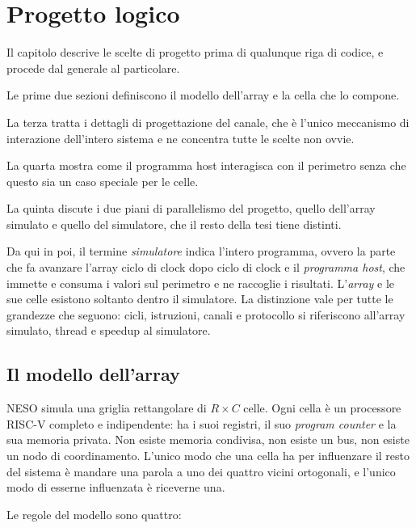\chapter{Progetto logico}
\label{ch:progetto}

Il capitolo descrive le scelte di progetto prima di qualunque riga di codice, e
procede dal generale al particolare. 

Le prime due sezioni definiscono il modello dell'array e la cella che lo compone. 

La terza tratta i dettagli di 
progettazione del canale, che è l'unico meccanismo di interazione dell'intero 
sistema e ne concentra tutte le scelte non ovvie. 

La quarta mostra come il programma host interagisca con il perimetro senza
che questo sia un caso speciale per le celle. 

La quinta discute i due piani di parallelismo del
progetto, quello dell'array simulato e quello del simulatore, che il resto
della tesi tiene distinti.

Da qui in poi, il termine \emph{simulatore} indica l'intero programma, ovvero
la parte che fa avanzare l'array ciclo di clock dopo ciclo di clock e il \emph{programma host},
che immette e consuma i valori sul perimetro e ne raccoglie i risultati.
L'\emph{array} e le sue celle esistono soltanto dentro il simulatore.
La distinzione vale per tutte le grandezze che seguono: cicli, istruzioni, canali
e protocollo si riferiscono all'array simulato, thread e speedup al simulatore.

\section{Il modello dell'array}
\label{sec:architettura}

NESO simula una griglia rettangolare di $R \times C$ celle. Ogni cella è un
processore RISC-V completo e indipendente: ha i suoi registri, il suo
\emph{program counter} e la sua memoria privata. Non esiste memoria condivisa,
non esiste un bus, non esiste un nodo di coordinamento. L'unico modo che una cella 
ha per influenzare il resto del sistema è mandare una parola a uno dei quattro vicini 
ortogonali, e l'unico modo di esserne influenzata è riceverne una.

Le regole del modello sono quattro:

